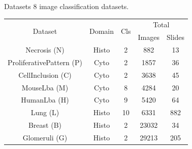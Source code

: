 \documentclass{beamer}
\begin{document}

\begin{frame}{Datasets}
8 image classification datasets. 

\begin{table}
    \center 
    \footnotesize
    \begin{tabular}{|c|c|c|cc|}
        \hline
        \multirow{2}{*}{Dataset} & \multirow{2}{*}{Domain} & \multirow{2}{*}{Cls} & \multicolumn{2}{c|}{Total} \\
        \cline{4-5}
        & & & Images & Slides \\
        \hline
        Necrosis (N) & Histo & 2 & 882 & 13 \\ %
        ProliferativePattern (P) & Cyto & 2 & 1857 & 36 \\ %
        CellInclusion (C) & Cyto & 2 & 3638 & 45 \\ %
        MouseLba  (M) & Cyto & 8 & 4284 & 20 \\ %
        HumanLba (H) & Cyto & 9 & 5420 & 64 \\ %
        Lung (L) & Histo & 10 & 6331 & 882 \\ %
        Breast (B) & Histo & 2 & 23032 & 34 \\ %
        Glomeruli (G) & Histo & 2 & 29213 & 205 \\ %
        \hline
    \end{tabular}
\end{table}
\begin{figure}
    \center

\end{figure}
\end{frame}
\end{document}

